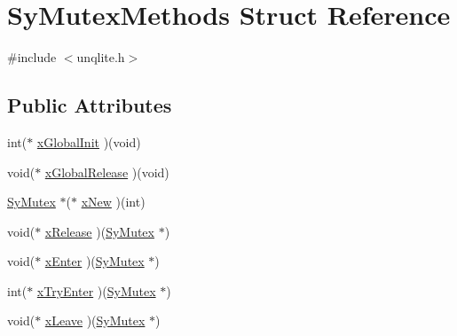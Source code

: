\hypertarget{struct_sy_mutex_methods}{\section{Sy\-Mutex\-Methods Struct Reference}
\label{d9/d6f/struct_sy_mutex_methods}
}


{\ttfamily \#include $<$unqlite.\-h$>$}

\subsection*{Public Attributes}
\begin{DoxyCompactItemize}
\item 
int($\ast$ \hyperlink{struct_sy_mutex_methods_a78325b9c74317afece08989a7e9da5d0}{x\-Global\-Init} )(void)
\item 
void($\ast$ \hyperlink{struct_sy_mutex_methods_a18ecc0161613436961790cecb7400842}{x\-Global\-Release} )(void)
\item 
\hyperlink{unqlite_8c_a1f52a7d2389ac9799eeca9ba107dcf0f}{Sy\-Mutex} $\ast$($\ast$ \hyperlink{struct_sy_mutex_methods_a4afd79bd187aac3d1dd72c5a1593b808}{x\-New} )(int)
\item 
void($\ast$ \hyperlink{struct_sy_mutex_methods_a0841b6ccb4bcb69426e9c8c50e953a98}{x\-Release} )(\hyperlink{unqlite_8c_a1f52a7d2389ac9799eeca9ba107dcf0f}{Sy\-Mutex} $\ast$)
\item 
void($\ast$ \hyperlink{struct_sy_mutex_methods_aec9ac983ac838814d74708d45427cc95}{x\-Enter} )(\hyperlink{unqlite_8c_a1f52a7d2389ac9799eeca9ba107dcf0f}{Sy\-Mutex} $\ast$)
\item 
int($\ast$ \hyperlink{struct_sy_mutex_methods_aec1f9171718b6e559801bdf519467aeb}{x\-Try\-Enter} )(\hyperlink{unqlite_8c_a1f52a7d2389ac9799eeca9ba107dcf0f}{Sy\-Mutex} $\ast$)
\item 
void($\ast$ \hyperlink{struct_sy_mutex_methods_a754cdbb6add51e8a2946a63e89901c75}{x\-Leave} )(\hyperlink{unqlite_8c_a1f52a7d2389ac9799eeca9ba107dcf0f}{Sy\-Mutex} $\ast$)
\end{DoxyCompactItemize}


